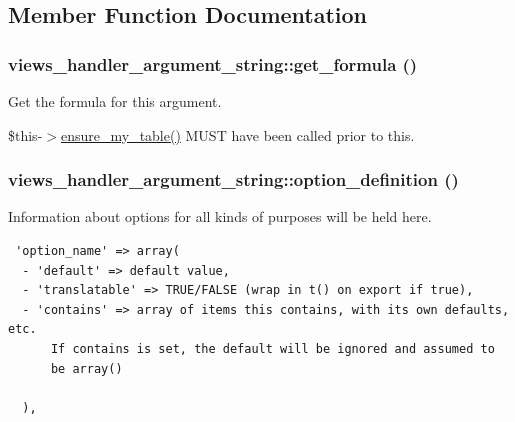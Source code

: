 \subsection{Member Function Documentation}
\hypertarget{classviews__handler__argument__string_8c039cb85ad264fd03ff5cdef379dfb5}{
\subsubsection[{get\_\-formula}]{\setlength{\rightskip}{0pt plus 5cm}views\_\-handler\_\-argument\_\-string::get\_\-formula ()}}
\label{classviews__handler__argument__string_8c039cb85ad264fd03ff5cdef379dfb5}


Get the formula for this argument.

\$this-$>$\hyperlink{classviews__handler_947f21ef0f21a77f4d103af4702b3600}{ensure\_\-my\_\-table()} MUST have been called prior to this. \hypertarget{classviews__handler__argument__string_f27f79196cc9e29b2bbc635a896510e1}{
\subsubsection[{option\_\-definition}]{\setlength{\rightskip}{0pt plus 5cm}views\_\-handler\_\-argument\_\-string::option\_\-definition ()}}
\label{classviews__handler__argument__string_f27f79196cc9e29b2bbc635a896510e1}


Information about options for all kinds of purposes will be held here. 

\begin{Code}\begin{verbatim} 'option_name' => array(
  - 'default' => default value,
  - 'translatable' => TRUE/FALSE (wrap in t() on export if true),
  - 'contains' => array of items this contains, with its own defaults, etc.
      If contains is set, the default will be ignored and assumed to
      be array()

  ),
\end{verbatim}
\end{Code}

